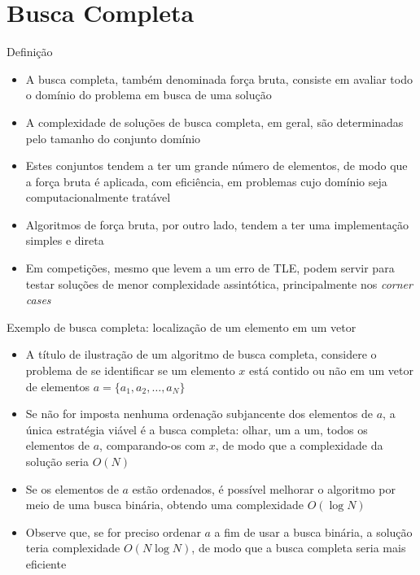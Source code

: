 \section{Busca Completa}

\begin{frame}[fragile]{Definição}

    \begin{itemize}
        \item A busca completa, também denominada força bruta, consiste em avaliar todo o
            domínio do problema em busca de uma solução

        \item A complexidade de soluções de busca completa, em geral, são determinadas pelo
            tamanho do conjunto domínio

        \item Estes conjuntos tendem a ter um grande número de elementos, de modo que a força
            bruta é aplicada, com eficiência, em problemas cujo domínio seja computacionalmente
            tratável

        \item Algoritmos de força bruta, por outro lado, tendem a ter uma implementação simples e
            direta

        \item Em competições, mesmo que levem a um erro de TLE, podem servir para testar soluções
            de menor complexidade assintótica, principalmente nos \textit{corner cases}
    \end{itemize}

\end{frame}

\begin{frame}[fragile]{Exemplo de busca completa: localização de um elemento em um vetor}

    \begin{itemize}
        \item A título de ilustração de um algoritmo de busca completa, considere o problema
            de se identificar se um elemento $x$ está contido ou não em um vetor de elementos
            $a = \lbrace a_1, a_2, \ldots, a_N\rbrace$

        \item Se não for imposta nenhuma ordenação subjancente dos elementos de $a$, a única
            estratégia viável é a busca completa: olhar, um a um, todos os elementos de $a$,
            comparando-os com $x$, de modo que a complexidade da solução seria $O(N)$

        \item Se os elementos de $a$ estão ordenados, é possível melhorar o algoritmo por 
            meio de uma busca binária, obtendo uma complexidade $O(\log N)$

        \item Observe que, se for preciso ordenar $a$ a fim de usar a busca binária, a solução teria
            complexidade $O(N\log N)$, de modo que a busca completa seria mais eficiente
    \end{itemize}

\end{frame}

